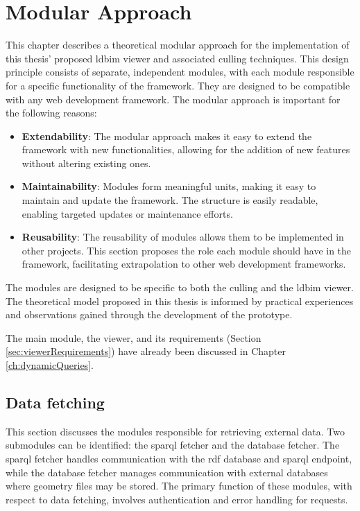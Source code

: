 \chapter{Modular Approach} \label{ch:modularApproach}
This chapter describes a theoretical modular approach for the implementation of this thesis' proposed \ac{ldbim} viewer and associated culling techniques. This design principle consists of separate, independent modules, with each module responsible for a specific functionality of the framework. They are designed to be compatible with any web development framework. The modular approach is important for the following reasons:

\begin{itemize}
    \item \textbf{Extendability}: The modular approach makes it easy to extend the framework with new functionalities, allowing for the addition of new features without altering existing ones.
    \item \textbf{Maintainability}: Modules form meaningful units, making it easy to maintain and update the framework. The structure is easily readable, enabling targeted updates or maintenance efforts.
    \item \textbf{Reusability}: The reusability of modules allows them to be implemented in other projects. This section proposes the role each module should have in the framework, facilitating extrapolation to other web development frameworks.
\end{itemize}

The modules are designed to be specific to both the culling and the \ac{ldbim} viewer. The theoretical model proposed in this thesis is informed by practical experiences and observations gained through the development of the prototype.

The main module, the viewer, and its requirements (Section \ref{sec:viewerRequirements}) have already been discussed in Chapter \ref{ch:dynamicQueries}.

\section{Data fetching}
This section discusses the modules responsible for retrieving external data. Two submodules can be identified: the \ac{sparql} fetcher and the database fetcher. The \ac{sparql} fetcher handles communication with the \ac{rdf} database and \ac{sparql} endpoint, while the database fetcher manages communication with external databases where geometry files may be stored. The primary function of these modules, with respect to data fetching, involves authentication and error handling for requests.

